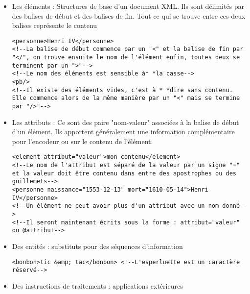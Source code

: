 \documentclass[18pt,a4paper,oneside]{book} %
\begin{document}
\begin{itemize}
\item Les éléments : Structures de base d'un document XML. Ils sont délimités par des balises de début et des balises de fin. Tout ce qui se trouve entre ces deux balises représente le contenu
\lstset{language=XML}

\begin{lstlisting}
<personne>Henri IV</personne>
<!--La balise de début commence par un "<" et la balise de fin par "</", on trouve ensuite le nom de l'élément enfin, toutes deux se terminent par un ">"-->
<!--Le nom des éléments est sensible à* *la casse-->
<pb/>
<!--Il existe des éléments vides, c'est à * *dire sans contenu. Elle commence alors de la même manière par un "<" mais se termine par "/>"-->
\end{lstlisting}

\item Les attributs : Ce sont des paire "nom-valeur" associées à la balise de début d'un élément. Ils apportent généralement une information complémentaire pour l'encodeur ou sur le contenu de l'élément.

\begin{lstlisting}
<element attribut="valeur">mon contenu</element>
<!--Le nom de l'attribut est séparé de la valeur par un signe "=" et la valeur doit être contenu dans entre des apostrophes ou des guillemets-->
<personne naissance="1553-12-13" mort="1610-05-14">Henri IV</personne>
<!--Un élément ne peut avoir plus d'un attribut avec un nom donné-->
<!--Il seront maintenant écrits sous la forme : attribut="valeur" ou @attribut-->
\end{lstlisting}
\item Des entités : substituts pour des séquences d'information

\begin{lstlisting}
<bonbon>tic &amp; tac</bonbon> <!--L'esperluette est un caractère réservé-->
\end{lstlisting}
\item Des instructions de traitements : applications extérieures


\end{itemize}
\end{document}
